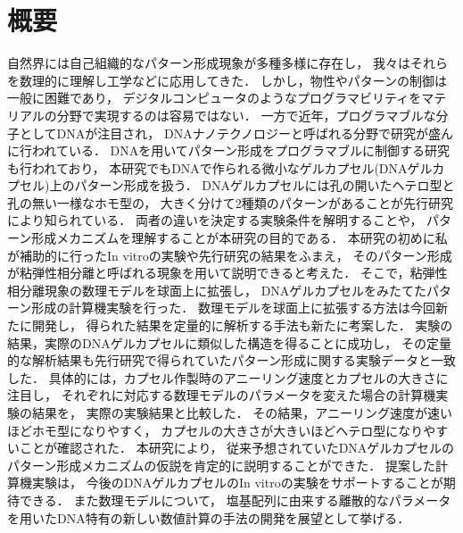 \chapter*{概要}

自然界には自己組織的なパターン形成現象が多種多様に存在し，
我々はそれらを数理的に理解し工学などに応用してきた．
しかし，物性やパターンの制御は一般に困難であり，
デジタルコンピュータのようなプログラマビリティをマテリアルの分野で実現するのは容易ではない．
一方で近年，プログラマブルな分子としてDNAが注目され，
DNAナノテクノロジーと呼ばれる分野で研究が盛んに行われている．
DNAを用いてパターン形成をプログラマブルに制御する研究も行われており，
本研究でもDNAで作られる微小なゲルカプセル(DNAゲルカプセル)上のパターン形成を扱う．
DNAゲルカプセルには孔の開いたヘテロ型と孔の無い一様なホモ型の，
大きく分けて2種類のパターンがあることが先行研究により知られている．
両者の違いを決定する実験条件を解明することや，
パターン形成メカニズムを理解することが本研究の目的である．
本研究の初めに私が補助的に行ったIn vitroの実験や先行研究の結果をふまえ，
そのパターン形成が粘弾性相分離と呼ばれる現象を用いて説明できると考えた．
そこで，粘弾性相分離現象の数理モデルを球面上に拡張し，
DNAゲルカプセルをみたてたパターン形成の計算機実験を行った．
数理モデルを球面上に拡張する方法は今回新たに開発し，
得られた結果を定量的に解析する手法も新たに考案した．
%
実験の結果，実際のDNAゲルカプセルに類似した構造を得ることに成功し，
その定量的な解析結果も先行研究で得られていたパターン形成に関する実験データと一致した．
具体的には，カプセル作製時のアニーリング速度とカプセルの大きさに注目し，
それぞれに対応する数理モデルのパラメータを変えた場合の計算機実験の結果を，
実際の実験結果と比較した．
その結果，アニーリング速度が速いほどホモ型になりやすく，
カプセルの大きさが大きいほどヘテロ型になりやすいことが確認された．
%
本研究により，
従来予想されていたDNAゲルカプセルのパターン形成メカニズムの仮説を肯定的に説明することができた．
提案した計算機実験は，
今後のDNAゲルカプセルのIn vitroの実験をサポートすることが期待できる．
また数理モデルについて，
塩基配列に由来する離散的なパラメータを用いたDNA特有の新しい数値計算の手法の開発を展望として挙げる．
